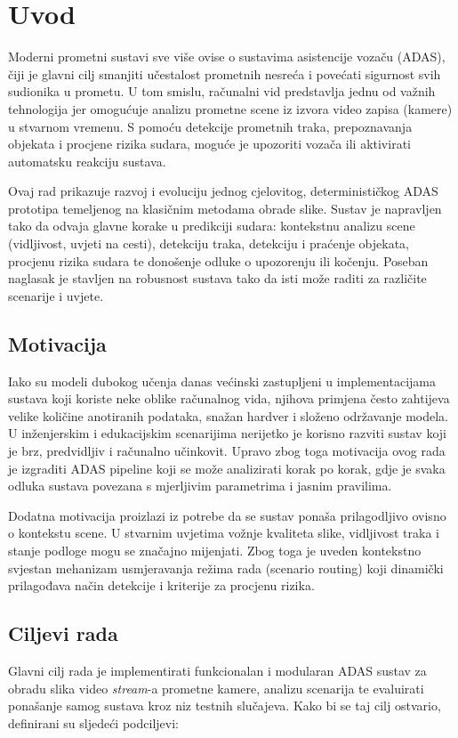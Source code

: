 \chapter{Uvod}

Moderni prometni sustavi sve više ovise o sustavima asistencije vozaču (ADAS), čiji je glavni cilj smanjiti učestalost prometnih nesreća i povećati sigurnost svih sudionika u prometu. U tom smislu, računalni vid predstavlja jednu od važnih tehnologija jer omogućuje analizu prometne scene iz izvora video zapisa (kamere) u stvarnom vremenu. S pomoću detekcije prometnih traka, prepoznavanja objekata i procjene rizika sudara, moguće je upozoriti vozača ili aktivirati automatsku reakciju sustava.

Ovaj rad prikazuje razvoj i evoluciju jednog cjelovitog, determinističkog ADAS prototipa temeljenog na klasičnim metodama obrade slike. Sustav je napravljen tako da odvaja glavne korake u predikciji sudara: kontekstnu analizu scene (vidljivost, uvjeti na cesti), detekciju traka, detekciju i praćenje objekata, procjenu rizika sudara te donošenje odluke o upozorenju ili kočenju. Poseban naglasak je stavljen na robusnost sustava tako da isti može raditi za različite scenarije i uvjete.

\section{Motivacija}
Iako su modeli dubokog učenja danas većinski zastupljeni u implementacijama sustava koji koriste neke oblike računalnog vida, njihova primjena često zahtijeva velike količine anotiranih podataka, snažan hardver i složeno održavanje modela. U inženjerskim i edukacijskim scenarijima nerijetko je korisno razviti sustav koji je brz, predvidljiv i računalno učinkovit. Upravo zbog toga motivacija ovog rada je izgraditi ADAS pipeline koji se može analizirati korak po korak, gdje je svaka odluka sustava povezana s mjerljivim parametrima i jasnim pravilima.

Dodatna motivacija proizlazi iz potrebe da se sustav ponaša prilagodljivo ovisno o kontekstu scene. U stvarnim uvjetima vožnje kvaliteta slike, vidljivost traka i stanje podloge mogu se značajno mijenjati. Zbog toga je uveden kontekstno svjestan mehanizam usmjeravanja režima rada (scenario routing) koji dinamički prilagođava način detekcije i kriterije za procjenu rizika.

\section{Ciljevi rada}
Glavni cilj rada je implementirati funkcionalan i modularan ADAS sustav za obradu slika video \textit{stream}-a prometne kamere, analizu scenarija te evaluirati ponašanje samog sustava kroz niz testnih slučajeva. Kako bi se taj cilj ostvario, definirani su sljedeći podciljevi:


